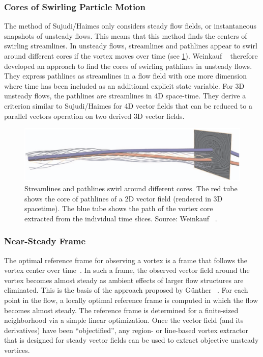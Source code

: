 \subsubsection{Cores of Swirling Particle Motion} %
\label{ssub:cores_of_swirling_particle_motion}
%
The method of Sujudi/Haimes only considers steady flow fields, or instantaneous
snapshots of unsteady flows.
%
This means that this method finds the centers of swirling streamlines.
%
In unsteady flows, streamlines and pathlines appear to swirl around different
cores if the vortex moves over time (see
\cref{fig:cores_of_swirling_particle_motion}).
%
Weinkauf \etal~\cite{Weinkauf2007} therefore developed an approach to find the
cores of swirling pathlines in unsteady flows.
%
They express pathlines as streamlines in a flow field with one more dimension
where time has been included as an additional explicit state variable.
%
For \ac{3D} unsteady flows, the pathlines are streamlines in \ac{4D} space-time.
%
They derive a criterion similar to Sujudi/Haimes for \ac{4D} vector fields that
can be reduced to a parallel vectors operation on two derived \ac{3D} vector
fields.
%
\begin{figure}[t]
    \centering
    \includegraphics[width=\textwidth]{figures/pathline_streamline_core.png}
    \caption{Streamlines and pathlines swirl around different cores. The red
    tube shows the core of pathlines of a \ac{2D} vector field (rendered in
    \ac{3D} spacetime). The blue tube shows the path of the vortex core
    extracted from the individual time slices. Source: Weinkauf
    \etal~\cite{Weinkauf2007}.}
    \label{fig:cores_of_swirling_particle_motion}
\end{figure}
%
%
\subsubsection{Near-Steady Frame} %
\label{ssub:near_steady_frame}
%
The optimal reference frame for observing a vortex is a frame that follows the
vortex center over time~\cite{Robinson1991}.
%
In such a frame, the observed vector field around the vortex becomes almost
steady as ambient effects of larger flow structures are eliminated.
%
This is the basis of the approach proposed by G\"unther
\etal~\cite{Guenther2017}.
%
For each point in the flow, a locally optimal reference frame is computed in
which the flow becomes almost steady.
%
The reference frame is determined for a finite-sized neighborhood via a simple
linear optimization.
%
Once the vector field (and its derivatives) have been ``objectified'', any
region- or line-based vortex extractor that is designed for steady vector fields
can be used to extract objective unsteady vortices.
%
%
%
